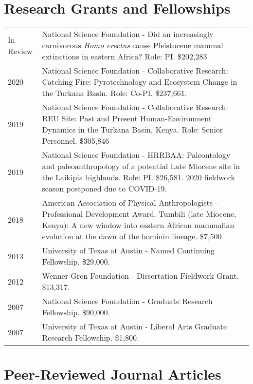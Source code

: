 \documentclass{article}
\begin{document}
\section*{Research Grants and Fellowships}
\begin{tabular}{p{}p{}}
In Review & National Science Foundation - Did an increasingly carnivorous \emph{Homo erectus} cause Pleistocene mammal extinctions in eastern Africa? Role: PI. \$202,283\\[4pt]
2020 & National Science Foundation - Collaborative Research: Catching Fire: Pyrotechnology and Ecosystem Change in the Turkana Basin. Role: Co-PI. \$237,661.\\[4pt]
2019 &  National Science Foundation - Collaborative Research: REU Site: Past and Present Human-Environment Dynamics in the Turkana Basin, Kenya. Role: Senior Personnel. \$305,846\\[4pt]
2019 & National Science Foundation - HRRBAA: Paleontology and paleoanthropology of a potential Late Miocene site in the Laikipia highlands. Role: PI. \$26,581. 2020 fieldwork season postponed due to COVID-19. \\[4pt]
2018 & American Association of Physical Anthropologists - Professional Development Award. Tumbili (late Miocene, Kenya): A new window into eastern African mammalian evolution at the dawn of the hominin lineage. \$7,500\\[4pt]
2013 &  University of Texas at Austin - Named Continuing Fellowship. \$29,000.\\[4pt]
2012  & Wenner-Gren Foundation - Dissertation Fieldwork Grant. \$13,317.\\[4pt]
2007 &  National Science Foundation - Graduate Research Fellowship. \$90,000.\\[4pt]
2007 &  University of Texas at Austin - Liberal Arts Graduate Research Fellowship. \$1,800.\\[4pt]

\end{tabular}

\section*{Peer-Reviewed Journal Articles}
\begin{etaremune}

\end{etaremune}
\end{document}
